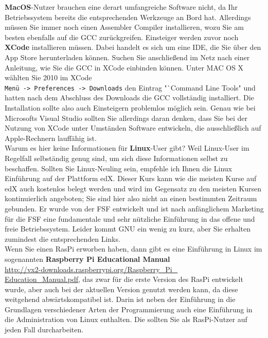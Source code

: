 \textbf{MacOS}-Nutzer brauchen eine derart umfangreiche Software nicht, da Ihr Betriebssystem bereits die entsprechenden Werkzeuge an Bord hat. Allerdings müssen Sie immer noch einen Assembler Compiler installieren, wozu Sie am besten ebenfalls auf die GCC zurückgreifen. Einsteiger werden zuvor noch \textbf{XCode} installieren müssen. Dabei handelt es sich um eine IDE, die Sie über den App Store herunterladen können. Suchen Sie anschließend im Netz nach einer Anleitung, wie Sie die GCC in XCode einbinden können. Unter MAC OS X wählten Sie 2010 im XCode\\ \verb|Menü -> Preferences -> Downloads| den Eintrag "`Command Line Tools" und hatten nach dem Abschluss des Downloads die GCC vollständig installiert. Die Installation sollte also auch Einsteigern problemlos möglich sein. Genau wie bei Microsofts Visual Studio sollten Sie allerdings daran denken, dass Sie bei der Nutzung von XCode unter Umständen Software entwickeln, die ausschließlich auf Apple-Rechnern lauffähig ist.\\

Warum es hier keine Informationen für \textbf{Linux}-User gibt? Weil Linux-User im Regelfall selbständig genug sind, um sich diese Informationen selbst zu beschaffen. Sollten Sie Linux-Neuling sein, empfehle ich Ihnen die Linux Einführung auf der Plattform edX. Dieser Kurs kann wie die meisten Kurse auf edX auch kostenlos belegt werden und wird im Gegensatz zu den meisten Kursen kontinuierlich angeboten; Sie sind hier also nicht an einen bestimmten Zeitraum gebunden. Er wurde von der FSF entwickelt und ist nach anfänglichem Marketing für die FSF eine fundamentale und sehr nützliche Einführung in das offene und freie Betriebssystem. Leider kommt GNU ein wenig zu kurz, aber Sie erhalten zumindest die entsprechenden Links.\\

Wenn Sie einen RasPi erworben haben, dann gibt es eine Einführung in Linux im sogenannten \textbf{Raspberry Pi Educational Manual} \\ \url{http://vx2-downloads.raspberrypi.org/Raspberry_Pi_} \\ \url{Education_Manual.pdf}, das zwar für die erste Version des RasPi entwickelt wurde, aber auch bei der aktuellen Version genutzt werden kann, da diese weitgehend abwärtskompatibel ist. Darin ist neben der Einführung in die Grundlagen verschiedener Arten der Programmierung auch eine Einführung in die Administration von Linux enthalten. Die sollten Sie als RasPi-Nutzer auf jeden Fall durcharbeiten.\\

